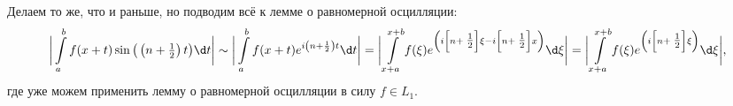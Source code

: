 \begin{uproof}
    Делаем то же, что и раньше, но подводим всё к лемме о равномерной осцилляции:
    \begin{equation*}
        \bigg| \int\limits_{a}^{b}  f(x+t) \sin\big(\left(n + \textstyle \frac{1}{2}\right) t \big) \d t \bigg| \sim 
        \bigg|
            \int\limits_{a}^{b} f(x+t) e^{i\left(n + \frac{1}{2}\right)t} \d t
        \bigg| = 
        \bigg|
            \int\limits_{x +a}^{x + b}  f(\xi) e^{\left(
                i\left[
                    n + \textstyle \frac{1}{2}
                \right] \xi - i \left[
                    n + \textstyle \frac{1}{2}
                \right] x
            \right)} \d \xi
        \bigg| = 
        \bigg|
            \int\limits_{x +a}^{x + b}  f(\xi) e^{\left(
                i\left[n + \textstyle \frac{1}{2}\right] \xi
            \right) }\d \xi
        \bigg|,
    \end{equation*}
    где уже можем применить лемму о равномерной осцилляции в силу $f \in L_1$. 
\end{uproof}

